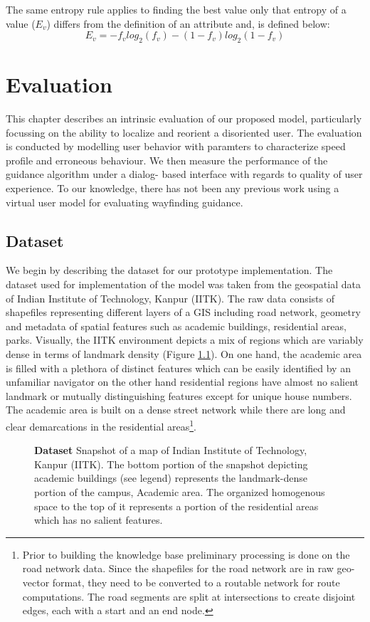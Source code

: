 \documentclass{iitkthesis}
\begin{document}
The same entropy rule applies to finding the best value only that entropy of a value ($E_v$) differs from the definition of an attribute and, is defined below:
\[\displaystyle E_{v} = - f_vlog_{2}{(f_v)} - (1-f_v)log_{2}{(1-f_v)}\] 

 \chapter{Evaluation}
This chapter describes an intrinsic evaluation of our proposed model, 
particularly focussing on the ability to localize and reorient a 
disoriented user. The evaluation is conducted by modelling user behavior 
with paramters to characterize speed profile and erroneous behaviour. We 
then measure the performance of the guidance algorithm under a dialog-
based interface with regards to quality of user experience. To our 
knowledge, there has not been any previous work using a virtual user 
model for evaluating wayfinding guidance. 
 
 \label{evaluation}
 \section{Dataset}
We begin by describing the dataset for our prototype implementation. The 
dataset used for implementation of the model was taken from the 
geospatial data of Indian Institute of Technology, Kanpur (IITK). The raw 
data consists of shapefiles representing different layers of a GIS 
including road network, geometry and metadata of spatial features such as 
academic buildings, residential areas, parks. Visually, the IITK 
environment depicts a mix of regions which are variably dense in terms of 
landmark density (Figure \ref{fig:dataset}). On one hand, the academic 
area is filled with a plethora of distinct features which can be easily 
identified by an unfamiliar navigator on the other hand residential 
regions have almost no salient landmark or mutually distinguishing 
features except for unique house numbers. The 
academic area is built on a dense street network while there are long and 
clear demarcations in the residential areas\footnote{Prior to building the knowledge base preliminary processing 
is done on the road network data. Since the shapefiles for the road network 
are in raw geo-vector format, they need to be converted to a routable 
network for route computations. The road segments are split at 
intersections to create disjoint edges, each with a start and an end node.}.
\begin{figure}
\centering
{}
\caption{\textbf{\textbf{Dataset}} Snapshot of a map of Indian 
Institute of Technology, Kanpur (IITK). The bottom portion of the snapshot 
depicting academic buildings (see legend) represents the landmark-dense 
portion of the campus, Academic area. The organized homogenous space to 
the top of it represents a portion of the residential areas which has 
no salient features.}
\label{fig:dataset}
 \end{figure} 
\end{document}
